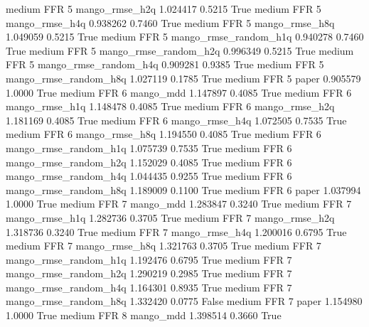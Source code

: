     medium      FFR                 5        mango_rmse_h2q   1.024417      0.5215    True
    medium      FFR                 5        mango_rmse_h4q   0.938262      0.7460    True
    medium      FFR                 5        mango_rmse_h8q   1.049059      0.5215    True
    medium      FFR                 5 mango_rmse_random_h1q   0.940278      0.7460    True
    medium      FFR                 5 mango_rmse_random_h2q   0.996349      0.5215    True
    medium      FFR                 5 mango_rmse_random_h4q   0.909281      0.9385    True
    medium      FFR                 5 mango_rmse_random_h8q   1.027119      0.1785    True
    medium      FFR                 5                 paper   0.905579      1.0000    True
    medium      FFR                 6             mango_mdd   1.147897      0.4085    True
    medium      FFR                 6        mango_rmse_h1q   1.148478      0.4085    True
    medium      FFR                 6        mango_rmse_h2q   1.181169      0.4085    True
    medium      FFR                 6        mango_rmse_h4q   1.072505      0.7535    True
    medium      FFR                 6        mango_rmse_h8q   1.194550      0.4085    True
    medium      FFR                 6 mango_rmse_random_h1q   1.075739      0.7535    True
    medium      FFR                 6 mango_rmse_random_h2q   1.152029      0.4085    True
    medium      FFR                 6 mango_rmse_random_h4q   1.044435      0.9255    True
    medium      FFR                 6 mango_rmse_random_h8q   1.189009      0.1100    True
    medium      FFR                 6                 paper   1.037994      1.0000    True
    medium      FFR                 7             mango_mdd   1.283847      0.3240    True
    medium      FFR                 7        mango_rmse_h1q   1.282736      0.3705    True
    medium      FFR                 7        mango_rmse_h2q   1.318736      0.3240    True
    medium      FFR                 7        mango_rmse_h4q   1.200016      0.6795    True
    medium      FFR                 7        mango_rmse_h8q   1.321763      0.3705    True
    medium      FFR                 7 mango_rmse_random_h1q   1.192476      0.6795    True
    medium      FFR                 7 mango_rmse_random_h2q   1.290219      0.2985    True
    medium      FFR                 7 mango_rmse_random_h4q   1.164301      0.8935    True
    medium      FFR                 7 mango_rmse_random_h8q   1.332420      0.0775   False
    medium      FFR                 7                 paper   1.154980      1.0000    True
    medium      FFR                 8             mango_mdd   1.398514      0.3660    True
